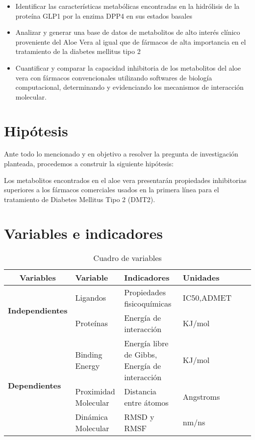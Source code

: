 \begin{itemize}
 \item Identificar las características metabólicas encontradas en la hidrólisis de la proteína GLP1 por la enzima DPP4 en sus estados basales
 \item Analizar y generar una base de datos de metabolitos de alto interés clínico proveniente del Aloe Vera al igual que de fármacos de alta importancia en el tratamiento de la diabetes mellitus tipo 2 
 \item Cuantificar y comparar la capacidad inhibitoria de los metabolitos del aloe vera con fármacos convencionales utilizando softwares de biología computacional, determinando y evidenciando los mecanismos de interacción molecular.

\end{itemize}

\section{Hipótesis}
Ante todo lo mencionado y en objetivo a resolver la pregunta de investigación planteada, procedemos a construir la siguiente hipótesis:

Los metabolitos encontrados en el aloe vera presentarán propiedades inhibitorias superiores a los fármacos comerciales usados en la primera línea para el tratamiento de Diabetes Mellitus Tipo 2 (DMT2).  


\section{Variables e indicadores}

 \begin{table}[htbp]
 \caption{Cuadro de variables}\label{t1}
  \begin{tabular}{llcp{3.5cm}p{3.5cm}p{3.5cm}cp{3.5cm}}
  \hline
  \multicolumn{3}{c}{\textbf{Variables}}                       & \textbf{Variable}      & \textbf{Indicadores}                 & \textbf{Unidades} \\ \hline
  \multicolumn{3}{c}{\multirow{2}{*}{\textbf{Independientes}}} 
  & Ligandos & Propiedades fisicoquímicas & IC50,ADMET\\ \cline{4-6} 
  \multicolumn{3}{c}{}                                         &Proteínas  & Energía de interacción  & KJ/mol \\ \hline
  \multicolumn{3}{l}{\multirow{3}{*}{\textbf{Dependientes}}}   &Binding Energy   &Energía libre de Gibbs, Energía de interacción   & KJ/mol \\ \cline{4-6} 
  \multicolumn{3}{l}{}                                         &Proximidad Molecular   &Distancia entre átomos   &Angstroms \\ \cline{4-6} 
  \multicolumn{3}{l}{}                                         &Dinámica Molecular   &RMSD y RMSF   &nm/ns \\ \hline 
  \end{tabular}
\end{table}

